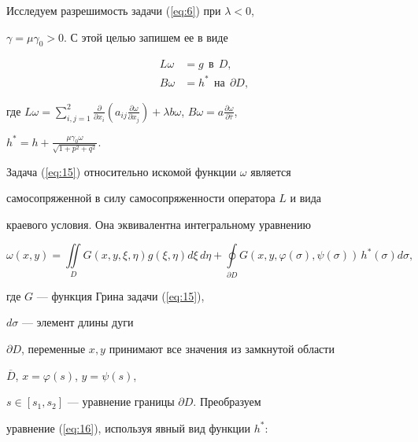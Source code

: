 Исследуем разрешимость задачи (\ref{eq:6}) при $\lambda < 0$, 


$\gamma=\mu \gamma_0 > 0$. С этой целью запишем ее в виде


\begin{equation}\label{eq:15}


\begin{split}


L\omega &= g \ \ \text{в} \ \ D, \\


B\omega &= h^\ast \ \ \text{на}\ \ \partial D,


\end{split}


\end{equation}


где $L\omega=\sum\limits_{i,j=1}^2 {\frac{\partial }{\partial x_i }}


({a_{ij} \frac{\partial \omega }{\partial x_j }})+\lambda 


b\omega$, $B\omega=a\frac{\partial \omega }{\partial \overline \tau }$, 


$h^\ast=h+\frac{\mu \gamma_0 \omega }{\sqrt {1+p^2+q^2} }$.


Задача (\ref{eq:15}) относительно искомой функции $\omega$ является


самосопряженной в силу самосопряженности оператора $L$ и вида


краевого условия. Она эквивалентна интегральному уравнению


\begin{equation}\label{eq:16}


\omega ({x,y})=\iint\limits_D {G ({x,y,\xi ,\eta })g


({\xi ,\eta })d\xi\, d\eta +


\oint\limits_{\partial D} {G ({x,y,\varphi (\sigma),\psi


(\sigma)})\,} } h^\ast (\sigma)d\sigma ,


\end{equation}


где $G$ --- функция Грина задачи (\ref{eq:15}),


$d\sigma$ --- элемент длины дуги


$\partial D$, переменные $x, y$ принимают все значения из замкнутой области


$\overline D $, $x=\varphi (s)$, $y=\psi (s)$,


$s \in [ {s_1 ,s_2 } ]$ --- уравнение границы $\partial D$. Преобразуем 


уравнение (\ref{eq:16}), используя явный вид функции $h^\ast$:


